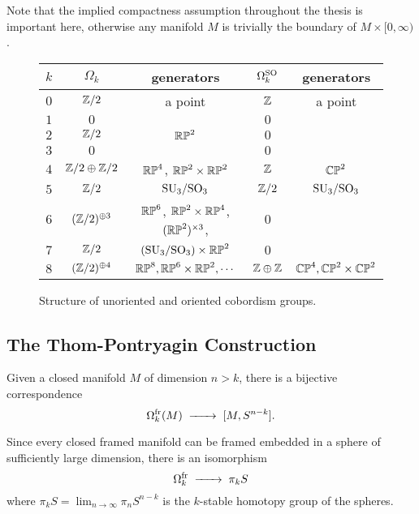 \begin{remark}
	Note that the implied compactness assumption throughout the thesis is important here, otherwise any manifold $M$ is trivially the boundary of $M\times [0,\infty)$. 
\end{remark}

\begin{figure}[ht]
	\renewcommand{\arraystretch}{1.2}
	\centering
	\begin{tabular}{r||c|c||c|c}
		$k$ & $\Omega_k$ & generators & $\Omega_k^{\mathrm{SO}}$ & generators \\
		\hline
		$0$ & $\mathbb{Z}/2$ & a point & $\mathbb{Z}$ & a point\\
		$1$ & $0$ & & $0$ & \\
		$2$ & $\mathbb{Z}/2$ & $\mathbb{RP}^2$ & $0$ & \\
		$3$ & $0$ & & $0$ & \\
		$4$ & $\mathbb{Z}/2\oplus \mathbb{Z}/2$ & $\mathbb{RP}^4$, $\mathbb{RP}^2\times \mathbb{RP}^2$ & $\mathbb{Z}$ & $\mathbb{CP}^2$ \\
		$5$ & $\mathbb{Z}/2$ & $\mathrm{SU}_3/\mathrm{SO}_3$ & $\mathbb{Z}/2$ & $\mathrm{SU}_3/\mathrm{SO}_3$\\
		$6$ & $(\mathbb{Z}/2)^{\oplus 3}$ & $\mathbb{RP}^6$, $\mathbb{RP}^2\times \mathbb{RP}^4$, $(\mathbb{RP}^2)^{\times 3}$, & $0$ & \\ 
		$7$ & $\mathbb{Z}/2$ & $(\mathrm{SU}_3/\mathrm{SO}_3) \times \mathbb{RP}^2$ & $0$ & \\ 
		$8$ & $(\mathbb{Z}/2)^{\oplus 4}$ & $\mathbb{RP}^8, \mathbb{RP}^6\times \mathbb{RP}^2, \cdots$ & $\mathbb{Z}\oplus \mathbb{Z}$ & $\mathbb{CP}^4, \mathbb{CP}^2\times \mathbb{CP}^2$\\
	\end{tabular}
	\medskip
	\caption{Structure of unoriented and oriented cobordism groups.}\label{fig:cobordism-structure-table}
\end{figure}

\subsection{The Thom-Pontryagin Construction}

\begin{theorem}
  Given a closed manifold $M$ of dimension $n>k$, there is a bijective correspondence
  \[
    \Omega^\fr_k(M) \lkxto[] [M, S^{n-k}].
  \]
\end{theorem}

\begin{corollary}
  Since every closed framed manifold can be framed embedded in a sphere of sufficiently large dimension, there is an isomorphism
  \[
    \Omega^\fr_k \lkxto \pi_k S
  \]
  where $\pi_k S = \lim_{n\to\infty} \pi_n S^{n-k}$ is the $k$-stable homotopy group of the spheres.
\end{corollary}

